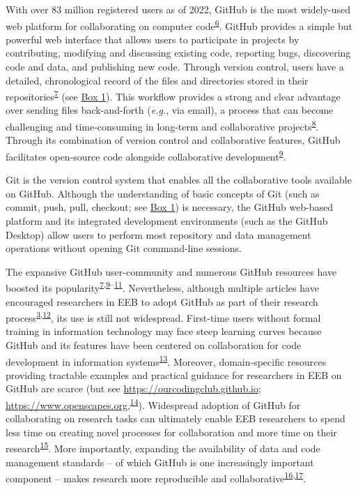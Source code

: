 With over 83 million registered users as of 2022, GitHub is the most widely-used web platform for collaborating on computer code\textsuperscript{\protect\hyperlink{ref-nwCtHDCn}{6}}.
GitHub provides a simple but powerful web interface that allows users to participate in projects by contributing, modifying and discussing existing code, reporting bugs, discovering code and data, and publishing new code.
Through version control, users have a detailed, chronological record of the files and directories stored in their repositories\textsuperscript{\protect\hyperlink{ref-RVetqmsg}{7}} (see \protect\hyperlink{definitions}{Box 1}).
This workflow provides a strong and clear advantage over sending files back-and-forth (\emph{e.g.}, via email), a process that can become challenging and time-consuming in long-term and collaborative projects\textsuperscript{\protect\hyperlink{ref-4ny1onB0}{8}}.
Through its combination of version control and collaborative features, GitHub facilitates open-source code alongside collaborative development\textsuperscript{\protect\hyperlink{ref-kEX5dgzK}{9}}.

Git is the version control system that enables all the collaborative tools available on GitHub.
Although the understanding of basic concepts of Git (such as commit, push, pull, checkout; see \protect\hyperlink{definitions}{Box 1}) is necessary, the GitHub web-based platform and its integrated development environments (such as the GitHub Desktop) allow users to perform most repository and data management operations without opening Git command-line sessions.

The expansive GitHub user-community and numerous GitHub resources have boosted its popularity\textsuperscript{\protect\hyperlink{ref-RVetqmsg}{7},\protect\hyperlink{ref-kEX5dgzK}{9}--\protect\hyperlink{ref-u5aEVE4B}{11}}.
Nevertheless, although multiple articles have encouraged researchers in EEB to adopt GitHub as part of their research process\textsuperscript{\protect\hyperlink{ref-10ghgV3S8}{3},\protect\hyperlink{ref-3DKwn1sY}{12}}, its use is still not widespread.
First-time users without formal training in information technology may face steep learning curves because GitHub and its features have been centered on collaboration for code development in information systems\textsuperscript{\protect\hyperlink{ref-139b0pSGc}{13}}.
Moreover, domain-specific resources providing tractable examples and practical guidance for researchers in EEB on GitHub are scarce (but see \url{https://ourcodingclub.github.io}; \url{https://www.openscapes.org},\textsuperscript{\protect\hyperlink{ref-lJAgyhYq}{14}}).
Widespread adoption of GitHub for collaborating on research tasks can ultimately enable EEB researchers to spend less time on creating novel processes for collaboration and more time on their research\textsuperscript{\protect\hyperlink{ref-ydrk01SR}{15}}.
More importantly, expanding the availability of data and code management standards -- of which GitHub is one increasingly important component -- makes research more reproducible and collaborative\textsuperscript{\protect\hyperlink{ref-13QX8XU3J}{16},\protect\hyperlink{ref-pq2Tv1BC}{17}}.

